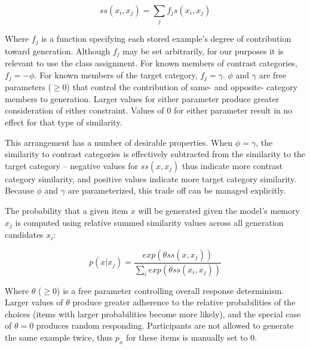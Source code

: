 \documentclass[12pt]{article}
\begin{document}
\begin{equation}
  ss(x_i, x_j) = \sum_j{f_j s(x_i, x_j)}
\end{equation}

Where $f_j$ is a function specifying each stored example's degree of contribution toward generation. Although $f_j$ may be set arbitrarily, for our purposes it is relevant to use the class assignment. For known members of contrast categories, $f_j = -\phi$. For known members of the target category, $f_j = \gamma$. $\phi$ and $\gamma$ are free parameters ($\geq 0$) that control the contribution of same- and opposite- category members to generation. Larger values for either parameter produce greater consideration of either constraint. Values of 0 for either parameter result in no effect for that type of similarity.

This arrangement has a number of desirable properties. When $\phi = \gamma$, the similarity to contrast categories is effectively subtracted from the similarity to the target category -- negative values for $ss(x, x_j)$ thus indicate more contrast category similarity, and positive values indicate more target category similarity. Because $\phi$ and $\gamma$ are parameterized, this trade off can be managed explicitly. 

The probability that a given item $x$ will be generated given the model's memory $x_j$ is computed using relative summed similarity values across all generation candidates $x_i$:

\begin{equation}
p(x|x_j) = \dfrac
    { exp( { \theta ss(x, x_j) } ) }
    { \sum_i{ exp( { \theta ss(x_i, x_j) } ) } }
\end{equation}

Where $\theta$ ($\geq 0$) is a free parameter controlling overall response determinism. Larger values of $\theta$ produce greater adherence to the relative probabilities of the choices (items with larger probabilities become more likely), and the special case of $\theta = 0$ produces random responding. Participants are not allowed to generate the same example twice, thus $p_x$ for these items is manually set to 0.
\end{document}
